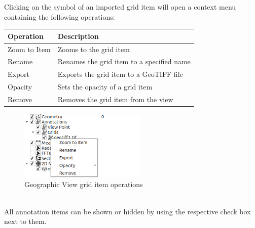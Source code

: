 Clicking on the symbol of an imported grid item will open a context menu containing the following operations:

\begin{table}[H]
    \center
    \begin{tabular}{ | l | l |}
      \hline
      \textbf{Operation} & \textbf{Description} \\ \hline
      Zoom to Item & Zooms to the grid item \\ \hline
      Rename & Renames the grid item to a specified name \\ \hline
      Export & Exports the grid item to a GeoTIFF file \\ \hline
      Opacity & Sets the opacity of a grid item \\ \hline
      Remove & Removes the grid item from the view \\ \hline
    \end{tabular}
\end{table}

\begin{figure}[H]
    \center
    \hspace*{-2.5cm}
    \includegraphics[width=6cm,frame]{figures/geoview_gridops_grid.png}
  \caption{Geographic View grid item operations}
\end{figure}
\ \\

All annotation items can be shown or hidden by using the respective check box next to them.
